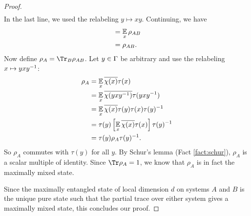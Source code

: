 \begin{proof}
\begin{align*}
	\end{align*}
	In the last line, we used the relabeling $y \mapsto xy$. Continuing, we have
	\begin{align*}
		&= \operatorname*{\mathbb E}\limits_{x}\rho_{AB}
		\\&= \rho_{AB}.
	\end{align*}
	Now define $\rho_A = \Tr_B \rho_{AB}$. Let $y\in \Gamma$ be arbitrary and use the relabeling $x \mapsto yxy^{-1}$:
	\begin{align*}
		\rho_A 
		&= \operatorname*{\mathbb E}\limits_{x} \overline{\chi(x)}\tau(x)
		\\&= \operatorname*{\mathbb E}\limits_{x} \overline{\chi(yxy^{-1})}\tau(yxy^{-1})
		\\&= \operatorname*{\mathbb E}\limits_{x} \overline{\chi(x)}\tau(y)\tau(x)\tau(y)^{-1}
		\\&= \tau(y)\left[\operatorname*{\mathbb E}\limits_{x} \overline{\chi(x)}\tau(x)\right]\tau(y)^{-1}
		\\&= \tau(y)\rho_A\tau(y)^{-1}.
	\end{align*}
	So $\rho_A$ commutes with $\tau(y)$ for all $y$. By Schur's lemma (Fact \ref{fact:schur}), $\rho_A$ is a scalar multiple of identity. Since $\Tr\rho_A = 1$, we know that $\rho_A$ is in fact the maximally mixed state. 
	
	Since the maximally entangled state of local dimension $d$ on systems $A$ and $B$ is the unique pure state such that the partial trace over either system gives a maximally mixed state, this concludes our proof. 
\end{proof}
